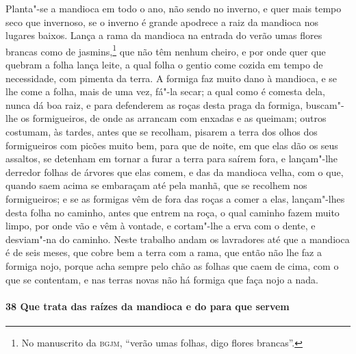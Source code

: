 Planta"-se a mandioca em todo o ano, não sendo no inverno, e quer mais tempo seco que
invernoso, se o inverno é grande apodrece a raiz da mandioca nos lugares baixos. Lança a
rama da mandioca na entrada do verão umas flores brancas como de jasmins,\footnote{ No
manuscrito da \textsc{bgjm}, ``verão umas folhas, digo flores brancas''.} que não têm
nenhum cheiro, e por onde quer que quebram a folha lança leite, a qual folha o gentio come
cozida em tempo de necessidade, com pimenta da terra. A formiga faz muito dano à mandioca,
e se lhe come a folha, mais de uma vez, fá"-la secar; a qual como é comesta dela, nunca dá
boa raiz, e para defenderem as roças desta praga da formiga, buscam"-lhe os formigueiros,
de onde as arrancam com enxadas e as queimam; outros costumam, às tardes, antes que se
recolham, pisarem a terra dos olhos dos formigueiros com picões muito bem, para que de
noite, em que elas dão os seus assaltos, se detenham em tornar a furar a terra para saírem
fora, e lançam"-lhe derredor folhas de árvores que elas comem, e das da mandioca velha, com
o que, quando saem acima se embaraçam até pela manhã, que se recolhem nos formigueiros; e
se as formigas vêm de fora das roças a comer a elas, lançam"-lhes desta folha no caminho,
antes que entrem na roça, o qual caminho fazem muito limpo, por onde vão e vêm à vontade,
e cortam"-lhe a erva com o dente, e desviam"-na do caminho. Neste trabalho andam os
lavradores até que a mandioca é de seis meses, que cobre bem a terra com a rama, que então
não lhe faz a formiga nojo, porque acha sempre pelo chão as folhas que caem de cima, com o
que se contentam, e nas terras novas não há formiga que faça nojo a nada.

\paragraph{38 Que trata das raízes da mandioca e do para que servem}


